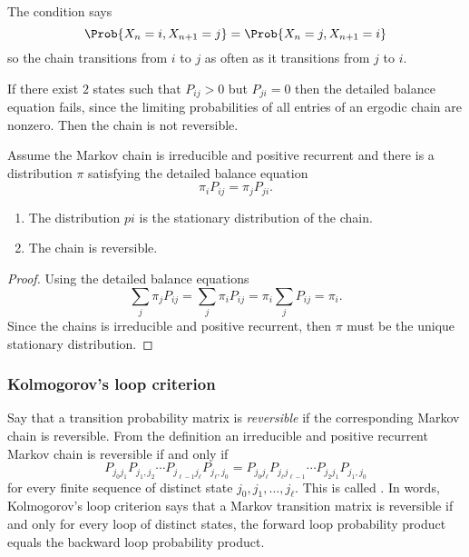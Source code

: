 \documentclass[12pt]{article}
\begin{document}
\begin{remark}
  The condition says
  \[
    \Prob{X_n =i, X_{n+1} = j} = \Prob{X_n =j, X_{n+1} = i}
  \]
  so the chain transitions from $i$ to $j$ as often as it transitions
  from $j$ to $i$.
\end{remark}

\begin{remark}
  If there exist $2$ states such that $P_{ij} > 0$ but $P_{ji} = 0$
  then the detailed balance equation fails, since the limiting probabilities of all
entries of an ergodic chain are nonzero. 
  Then the chain is not reversible.
\end{remark}

\begin{theorem}
  Assume the Markov chain is irreducible and positive recurrent and
  there is a distribution $\pi$ satisfying the detailed balance equation
  \[
    \pi_i P_{ij} = \pi_j P_{ji}.
  \]
  \begin{enumerate}
  \item The distribution $pi$ is the stationary distribution of the chain.
  \item The chain is reversible.
  \end{enumerate}
\end{theorem}

\begin{proof}
  Using the detailed balance equations
  \[
    \sum_j \pi_j P_{ij} = \sum_j \pi_i P_{ij} = \pi_i \sum_j P_{ij} =
    \pi_i.
  \]
  Since the chains is irreducible and positive recurrent, then $\pi$
  must be the unique stationary distribution.
\end{proof}

\subsubsection*{Kolmogorov's loop criterion}

Say that a transition probability matrix is
\emph{reversible} if the
corresponding Markov chain is reversible.  From the definition an
irreducible and positive recurrent Markov chain is reversible if and
only if
\[
  P_{j_0 j_1} P_{j_1,j_2} \cdots P_{j_{\ell-1} j_\ell} P_{j_\ell, j_0} =
  P_{j_0 j_\ell} P_{j_\ell j_{\ell-1}} \cdots P_{j_2 j_1} P_{j_1, j_0}
\]
for every finite sequence of distinct state $j_0, j_1, \dots, j_\ell$.
This is called .
In words, Kolmogorov’s loop criterion says that a Markov transition matrix is
reversible if and only for every loop of distinct states, the forward loop probability product
equals the backward loop probability product.
\end{document}
